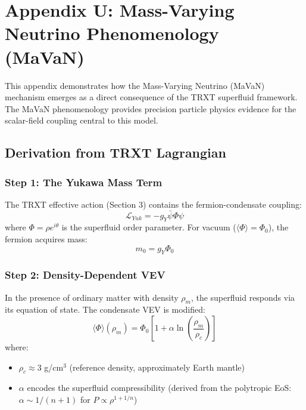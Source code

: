 \section{Appendix U: Mass-Varying Neutrino Phenomenology (MaVaN)}

This appendix demonstrates how the Mass-Varying Neutrino (MaVaN) mechanism emerges as a direct consequence of the TRXT superfluid framework. The MaVaN phenomenology provides precision particle physics evidence for the scalar-field coupling central to this model.

\subsection{Derivation from TRXT Lagrangian}

\subsubsection{Step 1: The Yukawa Mass Term}
The TRXT effective action (Section 3) contains the fermion-condensate coupling:
\begin{equation}
    \mathcal{L}_{Yuk} = -g_Y \bar{\psi} \Phi \psi
\end{equation}
where $\Phi = \rho e^{i\theta}$ is the superfluid order parameter. For vacuum ($\langle\Phi\rangle = \Phi_0$), the fermion acquires mass:
\begin{equation}
    m_0 = g_Y \Phi_0
\end{equation}

\subsubsection{Step 2: Density-Dependent VEV}
In the presence of ordinary matter with density $\rho_m$, the superfluid responds via its equation of state. The condensate VEV is modified:
\begin{equation}
    \langle \Phi \rangle(\rho_m) = \Phi_0 \left[1 + \alpha \ln\left(\frac{\rho_m}{\rho_c}\right)\right]
\end{equation}
where:
\begin{itemize}
    \item $\rho_c \approx 3$ g/cm$^3$ (reference density, approximately Earth mantle)
    \item $\alpha$ encodes the superfluid compressibility (derived from the polytropic EoS: $\alpha \sim 1/(n+1)$ for $P \propto \rho^{1+1/n}$)
\end{itemize}

